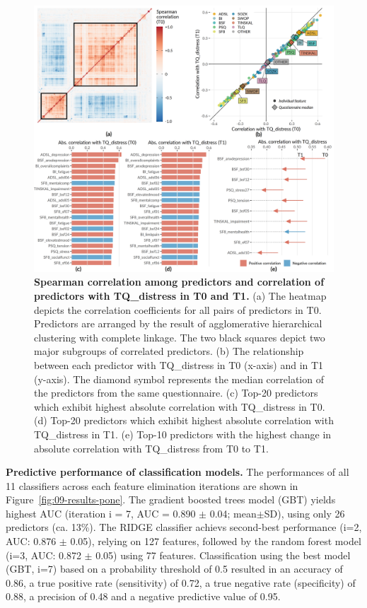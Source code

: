 \documentclass[
  oneside]{book}
\begin{document}
\begin{figure}

{\centering \includegraphics[width=1\linewidth]{figures/09-cor} 

}

\caption{\textbf{Spearman correlation among predictors and correlation of predictors with TQ\_distress in T0 and T1.} (a) The heatmap depicts the correlation coefficients for all pairs of predictors in T0. Predictors are arranged by the result of agglomerative hierarchical clustering with complete linkage. The two black squares depict two major subgroups of correlated predictors. (b) The relationship between each predictor with TQ\_distress in T0 (x-axis) and in T1 (y-axis). The diamond symbol represents the median correlation of the predictors from the same questionnaire. (c) Top-20 predictors which exhibit highest absolute correlation with TQ\_distress in T0. (d) Top-20 predictors which exhibit highest absolute correlation with TQ\_distress in T1. (e) Top-10 predictors with the highest change in absolute correlation with TQ\_distress from T0 to T1.}\label{fig:09-cor}
\end{figure}

\textbf{Predictive performance of classification models.} The performances of all 11 classifiers across each feature elimination iterations are shown in Figure~\ref{fig:09-results-pone}.
The gradient boosted trees model (GBT) yields highest AUC (iteration i = 7, AUC = 0.890 \(\pm\) 0.04; mean\(\pm\)SD), using only 26 predictors (ca. 13\%).
The RIDGE classifier achievs second-best performance (i=2, AUC: 0.876 \(\pm\) 0.05), relying on 127 features, followed by the random forest model (i=3, AUC: 0.872 \(\pm\) 0.05) using 77 features.
Classification using the best model (GBT, i=7) based on a probability threshold of 0.5 resulted in an accuracy of 0.86, a true positive rate (sensitivity) of 0.72, a true negative rate (specificity) of 0.88, a precision of 0.48 and a negative predictive value of 0.95.
\end{document}

